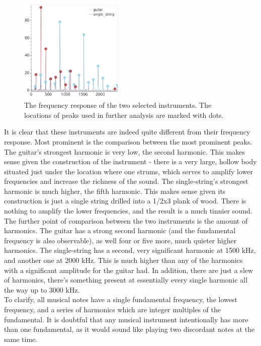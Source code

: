 \documentclass[aps,prl,reprint]{revtex4-2}
\begin{document}
\begin{figure}[h]
\includegraphics[width=0.44\textwidth]{../Images/l5_f_extra.png}
\caption{\label{instruments_ffts} The frequency response of the two
selected instruments. The locations of peaks used in further analysis
are marked with dots. }
\end{figure}

It is clear that these instruments are indeed quite different from their
frequency response. Most prominent is the comparison between the most
prominent peaks. The guitar's strongest harmonic is very low, the second
harmonic. This makes sense given the construction of the instrument -
there is a very large, hollow body situated just under the location
where one strums, which serves to amplify lower frequencies and increase
the richness of the sound. The single-string's strongest harmonic is much
higher, the fifth harmonic. This makes sense given its construction is just
a single string drilled into a 1/2x3 plank of wood. There is nothing to 
amplify the lower frequencies, and the result is a much tinnier sound. \\

The further point of comparison between the two instruments is the 
amount of harmonics. The guitar has a strong second harmonic (and the
fundamental frequency is also observable), as well four or five more,
much quieter higher harmonics. The single-string has a second, very
significant harmonic at 1500 kHz, and another one at 2000 kHz. This
is much higher than any of the harmonics with a significant amplitude
for the guitar had. In addition, there are just a slew of harmonics,
there's something present at essentially every single harmonic all
the way up to 3000 kHz. \\

To clarify, all musical notes have a single fundamental frequency, the
lowest frequency, and a series of harmonics which are integer multiples
of the fundamental. It is doubtful that any musical instrument 
intentionally has more than one fundamental, as it would sound like
playing two discordant notes at the same time. \\
\end{document}
